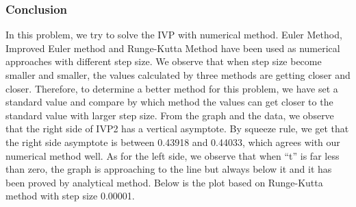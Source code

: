 \documentclass[11pt,a4paper]{article}
\begin{document}
\subsubsection{Conclusion}

In this problem, we try to solve the IVP with numerical method. Euler Method, Improved Euler method and Runge-Kutta Method have been used as numerical approaches with different step size. We observe that when step size become smaller and smaller, the values calculated by three methods are getting closer and closer. Therefore, to determine a better method for this problem, we have set a standard value and compare by which method the values can get closer to the standard value with larger step size. 
From the graph and the data, we observe that the right side of IVP2 has a vertical asymptote. By squeeze rule, we get that the right side asymptote is between 0.43918 and 0.44033, which agrees with our numerical method well. As for the left side, we observe that when “t” is far less than zero, the graph is approaching to the line but always below it and it has been proved by analytical method. 
Below is the plot based on Runge-Kutta method with step size 0.00001. 
\end{document}
